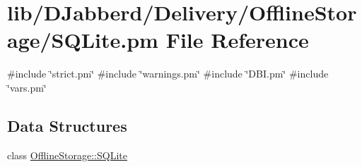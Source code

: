 \hypertarget{_s_q_lite_8pm}{
\section{lib/\-D\-Jabberd/\-Delivery/\-Offline\-Storage/\-S\-Q\-Lite.pm \-File \-Reference}
\label{_s_q_lite_8pm}
}
{\ttfamily \#include \char`\"{}strict.\-pm\char`\"{}}\*
{\ttfamily \#include \char`\"{}warnings.\-pm\char`\"{}}\*
{\ttfamily \#include \char`\"{}\-D\-B\-I.\-pm\char`\"{}}\*
{\ttfamily \#include \char`\"{}vars.\-pm\char`\"{}}\*
\subsection*{\-Data \-Structures}
\begin{DoxyCompactItemize}
\item 
class \hyperlink{class_d_jabberd_1_1_delivery_1_1_offline_storage_1_1_s_q_lite}{\-Offline\-Storage\-::\-S\-Q\-Lite}
\end{DoxyCompactItemize}
